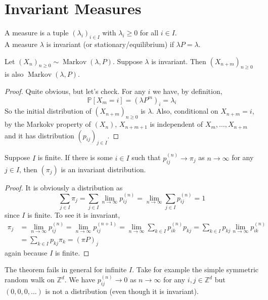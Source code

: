 \section{Invariant Measures}
\begin{definition}
    A measure is a tuple $(\lambda_i)_{i\in I}$ with $\lambda_i\ge 0$ for all $i\in I$.\\
    A measure $\lambda$ is invariant (or stationary/equilibrium) if $\lambda P=\lambda$.
\end{definition}
\begin{theorem}
    Let $(X_n)_{n\ge 0}\sim\operatorname{Markov}(\lambda,P)$.
    Suppose $\lambda$ is invariant.
    Then $(X_{n+m})_{n\ge 0}$ is also $\operatorname{Markov}(\lambda,P)$.
\end{theorem}
\begin{proof}
    Quite obvious, but let's check.
    For any $i$ we have, by definition,
    $$\mathbb P[X_m=i]=(\lambda P^m)_i=\lambda_i$$
    So the initial distribution of $(X_{n+m})_{n\ge 0}$ is $\lambda$.
    Also, conditional on $X_{n+m}=i$, by the Markokv property of $(X_n)$, $X_{n+m+1}$ is independent of $X_m,\ldots,X_{n+m}$ and it has distribution $(p_{ij})_{j\in I}$.
\end{proof}
\begin{theorem}\label{power_inv}
    Suppose $I$ is finite.
    If there is some $i\in I$ such that $p_{ij}^{(n)}\to\pi_j$ as $n\to\infty$ for any $j\in I$, then $(\pi_j)$ is an invariant distribution.
\end{theorem}
\begin{proof}
    It is obviously a distribution as
    $$\sum_{j\in I}\pi_j=\sum_{j\in I}\lim_{n\to\infty}p_{ij}^{(n)}=\lim_{n\to\infty}\sum_{j\in I}p_{ij}^{(n)}=1$$
    since $I$ is finite.
    To see it is invariant,
    \begin{align*}
        \pi_j&=\lim_{n\to\infty}p_{ij}^{(n)}=\lim_{n\to\infty}p_{ij}^{(n+1)}=\lim_{n\to\infty}\sum_{k\in I}p_{ik}^{(n)}p_{kj}=\sum_{k\in I}p_{kj}\lim_{n\to\infty}p_{ik}^{(n)}\\
        &=\sum_{k\in I}p_{kj}\pi_k=(\pi P)_j
    \end{align*}
    again because $I$ is finite.
\end{proof}
\begin{remark}
    The theorem fails in general for infinite $I$.
    Take for example the simple symmetric random walk on $\mathbb Z^d$.
    We have $p_{ij}^{(n)}\to 0$ as $n\to\infty$ for any $i,j\in\mathbb Z^d$ but $(0,0,0,\ldots)$ is not a distribution (even though it is invariant).
\end{remark}
